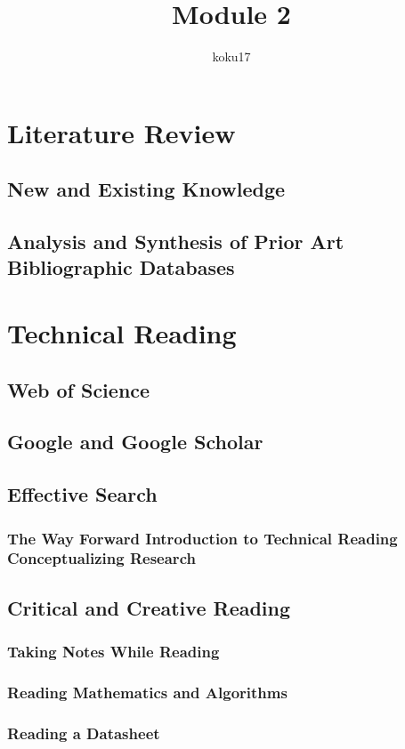 \documentclass{article}
\author{koku17}
\title{Module 2}
\begin{document}
	 \maketitle \newpage
	 \tableofcontents \newpage
	\section{Literature Review}
	\subsection{New and Existing Knowledge}
	\subsection{Analysis and Synthesis of Prior Art Bibliographic Databases}

	\section{Technical Reading}
	\subsection{Web of Science}
	\subsection{Google and Google Scholar}
	\subsection{Effective Search}
	\subsubsection{The Way Forward Introduction to Technical Reading Conceptualizing Research}
	\subsection{Critical and Creative Reading}
	\subsubsection{Taking Notes While Reading}
	\subsubsection{Reading Mathematics and Algorithms}
	\subsubsection{Reading a Datasheet}
	
\end{document}

